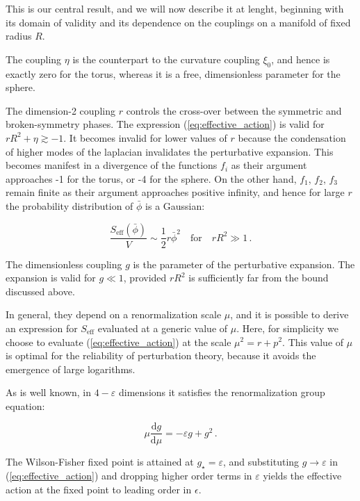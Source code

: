 \documentclass[11pt,a4paper]{article}
\newcommand{\dd}{\mathrm{d}}
\begin{document}
This is our central result, and we will now describe it at lenght, beginning
with its domain of validity and its dependence on the couplings on a manifold
of fixed radius $R$.

The coupling $\eta$ is the counterpart to the curvature coupling
$\xi_0$, and hence is exactly zero for the torus, whereas it is a free,
dimensionless parameter for the sphere.

The dimension-2 coupling $r$ controls the cross-over between the symmetric and
broken-symmetry phases. The expression (\ref{eq:effective_action}) is valid for
$r R^2 + \eta \gtrsim -1$. It becomes invalid for lower values of $r$ because
the condensation of higher modes of the laplacian invalidates the perturbative
expansion. This becomes manifest in a divergence of the functions $f_i$ as
their argument approaches -1 for the torus, or  -4 for the sphere.  On the
other hand, $f_1$, $f_2$, $f_3$ remain finite as their argument approaches
positive infinity, and hence for large $r$ the probability distribution of
$\bar{\phi}$ is a Gaussian:

\begin{equation}
  \frac{S_{\mathrm{eff}}(\bar{\phi})}{V} \sim \frac{1}{2} r \bar{\phi}^2
  \quad \text{for} \quad
  rR^2 \gg 1\,.
\end{equation}

The dimensionless coupling $g$ is the parameter of the perturbative expansion.
The expansion is valid for $g \ll 1$, provided $rR^2$ is sufficiently far from
the bound discussed above.



In general,
they depend on a renormalization scale $\mu$, and it is possible to derive an
expression for $S_{\mathrm{eff}}$ evaluated at a generic value of $\mu$. Here,
for simplicity we choose to evaluate (\ref{eq:effective_action}) at the scale
$\mu^2 = r + p^2$. This value of $\mu$ is optimal for the reliability of
perturbation theory, because it avoids the emergence of large logarithms.

  As is well
known, in $4 - \varepsilon$ dimensions it satisfies the renormalization group
equation:

\begin{equation}
  \mu \frac{\dd g}{\dd \mu} = -\varepsilon g + g^2\,.
\end{equation}

The Wilson-Fisher fixed point is attained at $g_{\star} = \varepsilon$, and
substituting $g \to \varepsilon$ in (\ref{eq:effective_action}) and dropping
higher order terms in $\varepsilon$ yields the effective action at the fixed
point to leading order in $\epsilon$.
\end{document}

